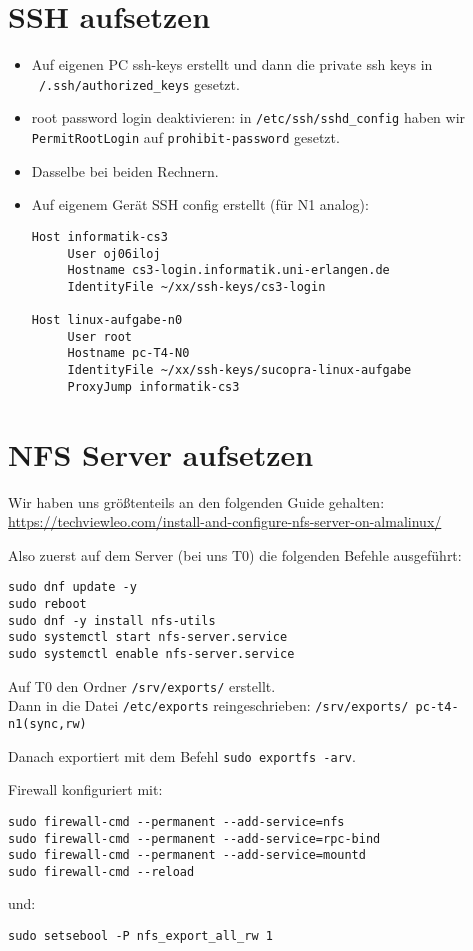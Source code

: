 \documentclass[a4paper,12pt,DIV=15, ngerman, parskip=half]{scrartcl}  %
\numberwithin{equation}{section}
\begin{document}
\section{SSH aufsetzen}
\label{sec:ssh-aufsetzen}

\begin{itemize}
\item Auf eigenen PC ssh-keys erstellt und dann die private ssh keys in \texttt{~/.ssh/authorized_keys} gesetzt.
\item root password login deaktivieren: in \texttt{/etc/ssh/sshd_config} haben wir \texttt{PermitRootLogin} auf \texttt{prohibit-password} gesetzt.
\item Dasselbe bei beiden Rechnern.
\item Auf eigenem Gerät SSH config erstellt (für N1 analog):
\begin{verbatim}
Host informatik-cs3
     User oj06iloj
     Hostname cs3-login.informatik.uni-erlangen.de
     IdentityFile ~/xx/ssh-keys/cs3-login

Host linux-aufgabe-n0
     User root
     Hostname pc-T4-N0
     IdentityFile ~/xx/ssh-keys/sucopra-linux-aufgabe
     ProxyJump informatik-cs3
\end{verbatim}
\end{itemize}




\section{NFS Server aufsetzen}
\label{sec:nfs-server-aufsetzen}
Wir haben uns größtenteils an den folgenden Guide gehalten: \url{https://techviewleo.com/install-and-configure-nfs-server-on-almalinux/}

Also zuerst auf dem Server (bei uns T0) die folgenden Befehle ausgeführt:
\begin{verbatim}
sudo dnf update -y
sudo reboot
sudo dnf -y install nfs-utils
sudo systemctl start nfs-server.service
sudo systemctl enable nfs-server.service
\end{verbatim}

Auf T0 den Ordner \texttt{/srv/exports/} erstellt.\\
Dann in die Datei \texttt{/etc/exports} reingeschrieben:  \texttt{/srv/exports/  pc-t4-n1(sync,rw)}

Danach exportiert mit dem Befehl \texttt{sudo exportfs -arv}.

Firewall konfiguriert mit:
\begin{verbatim}
sudo firewall-cmd --permanent --add-service=nfs
sudo firewall-cmd --permanent --add-service=rpc-bind
sudo firewall-cmd --permanent --add-service=mountd
sudo firewall-cmd --reload
\end{verbatim}
und:
\begin{verbatim}
sudo setsebool -P nfs_export_all_rw 1
\end{verbatim}
\end{document}
